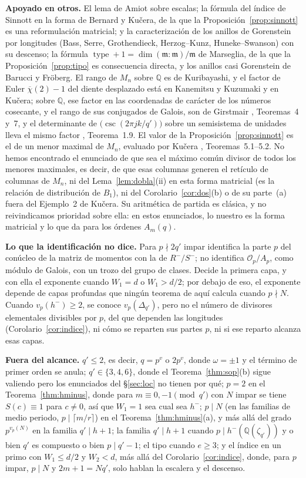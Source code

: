 \documentclass[11pt,a4paper]{article}
\theoremstyle{definition}
\newcommand{\QQ}{\mathbb{Q}}
\newcommand{\cO}{\mathcal{O}}
\begin{document}
\noindent\textbf{Apoyado en otros.} El lema de Amiot sobre escalas; la fórmula del índice de Sinnott en la forma de
Bernard y Kučera, de la que la Proposición~\ref{prop:sinnott} es una reformulación matricial; y la caracterización de
los anillos de Gorenstein por longitudes (Bass, Serre, Grothendieck, Herzog--Kunz, Huneke--Swanson) con su descenso; la
fórmula $\operatorname{type}+1=\dim(\mathfrak m:\mathfrak m)/\mathfrak m$ de Marseglia, de la que la
Proposición~\ref{prop:tipo} es consecuencia directa, y los anillos casi Gorenstein de Barucci y Fröberg. El rango de
$M_n$ sobre $\QQ$ es de Kuribayashi, y el factor de Euler $\overline\chi(2)-1$ del diente desplazado está en Kanemitsu y
Kuzumaki y en Kučera; sobre $\QQ$, ese factor en las coordenadas de carácter de los números cosecante, y el rango
de sus conjugados de Galois, son de Girstmair \cite{Gir87}, Teoremas~4 y~7, y el determinante de
$\bigl(\csc(2\pi jk/q')\bigr)$ sobre un semisistema de unidades lleva el mismo factor \cite{GG25}, Teorema~1.9. El valor de la Proposición~\ref{prop:sinnott} es el de un menor maximal de $M_n$, evaluado por
Kučera \cite{Kuc92}, Teoremas~5.1--5.2. No hemos encontrado el enunciado de que sea el máximo común divisor de todos
los menores maximales, es decir, de que esas columnas generen el retículo de columnas de $M_n$, ni del Lema~\ref{lem:dobla}(ii) en esta forma matricial (es la relación de distribución de
$B_1$), ni del Corolario~\ref{cor:dos}(b) o de su parte~(a) fuera del Ejemplo~2 de Kučera. Su
aritmética de partida es clásica, y no reivindicamos prioridad sobre ella: en estos enunciados, lo nuestro es la forma
matricial y lo que da para los órdenes $A_m(q)$.

\noindent\textbf{Lo que la identificación no dice.} Para $p\nmid 2q'$ impar identifica la parte $p$ del conúcleo de la
matriz de momentos con la de $R^-/S^-$; no identifica $\cO_p/A_p$, como módulo de Galois, con un trozo del grupo de
clases. Decide la primera capa, y con ella el exponente cuando $W_1=d$ o $W_1>d/2$; por debajo de eso, el exponente
depende de capas profundas que ningún teorema de aquí calcula cuando $p\nmid N$. Cuando $v_p(h^-)\ge2$, se conoce
$v_p(\Delta_{q'})$, pero no el número de divisores elementales divisibles por $p$, del que dependen las longitudes
(Corolario~\ref{cor:indice}), ni cómo se reparten sus partes $p$, ni si ese reparto alcanza esas capas.

\noindent\textbf{Fuera del alcance.} $q'\le2$, es decir, $q=p^v$ o $2p^v$, donde $\omega=\pm1$ y el término de primer
orden se anula; $q'\in\{3,4,6\}$, donde el Teorema~\ref{thm:sop}(b) sigue valiendo pero los enunciados del
\S\ref{sec:loc} no tienen por qué; $p=2$ en el Teorema~\ref{thm:hminus}, donde para $m\equiv0,-1\pmod{q'}$ con $N$
impar se tiene $S(c)\equiv1$ para $c\ne0$, así que $W_1=1$ sea cual sea $h^-$; $p\mid N$ (en las familias de medio periodo,
$p\mid\lceil m/r\rceil$) en el Teorema~\ref{thm:hminus}(a), y más allá del grado $p^{v_p(N)}$ en la familia
$q'\mid h+1$; la familia $q'\mid h+1$
cuando $p\mid h^-(\QQ(\zeta_{q'}))$ y o bien $q'$ es compuesto o bien $p\mid q'-1$; el tipo cuando $e\ge3$; y el índice
en un primo con $W_1\le d/2$ y $W_2<d$, más allá del Corolario~\ref{cor:indice}, donde, para $p$ impar, $p\mid N$ y $2m+1=Nq'$,
solo hablan la escalera y el descenso.
\end{document}
